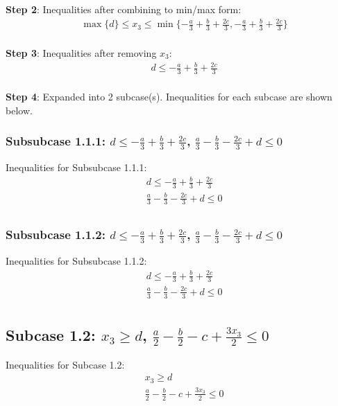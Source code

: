 \documentclass{article}
\begin{document}
\textbf{Step 2}: Inequalities after combining to min/max form:
\begin{align}
& \max\{d\} \leq x_{3} \leq \min\{- \frac{a}{3} + \frac{b}{3} + \frac{2 c}{3}, - \frac{a}{3} + \frac{b}{3} + \frac{2 c}{3}\} \\
\end{align}

\textbf{Step 3}: Inequalities after removing $x_{3}$:
\begin{align}
& d \leq - \frac{a}{3} + \frac{b}{3} + \frac{2 c}{3} \\
\end{align}

\textbf{Step 4}: Expanded into 2 subcase(s). Inequalities for each subcase are shown below.

\subsubsection{Subsubcase 1.1.1: $d \leq - \frac{a}{3} + \frac{b}{3} + \frac{2 c}{3}$, $\frac{a}{3} - \frac{b}{3} - \frac{2 c}{3} + d \leq 0$}

Inequalities for Subsubcase 1.1.1:
\begin{align}
& d \leq - \frac{a}{3} + \frac{b}{3} + \frac{2 c}{3} \\
& \frac{a}{3} - \frac{b}{3} - \frac{2 c}{3} + d \leq 0 \\
\end{align}

\subsubsection{Subsubcase 1.1.2: $d \leq - \frac{a}{3} + \frac{b}{3} + \frac{2 c}{3}$, $\frac{a}{3} - \frac{b}{3} - \frac{2 c}{3} + d \leq 0$}

Inequalities for Subsubcase 1.1.2:
\begin{align}
& d \leq - \frac{a}{3} + \frac{b}{3} + \frac{2 c}{3} \\
& \frac{a}{3} - \frac{b}{3} - \frac{2 c}{3} + d \leq 0 \\
\end{align}

\subsection{Subcase 1.2: $x_{3} \geq d$, $\frac{a}{2} - \frac{b}{2} - c + \frac{3 x_{3}}{2} \leq 0$}

Inequalities for Subcase 1.2:
\begin{align}
& x_{3} \geq d \\
& \frac{a}{2} - \frac{b}{2} - c + \frac{3 x_{3}}{2} \leq 0 \\
\end{align}
\end{document}
